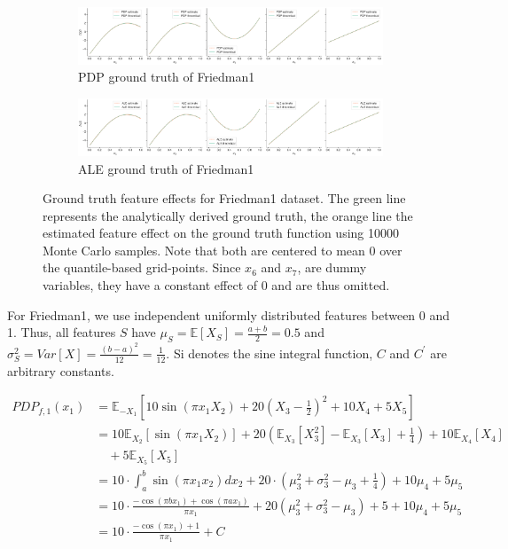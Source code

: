 \documentclass[runningheads]{llncs}
\begin{document}
\begin{figure}[h!]
    \begin{subfigure}[b]{\textwidth}
        \centering
        \includegraphics[width=\textwidth]{img/Friedman1-all/pdp_groundtruth_comparison.png}
        \caption{PDP ground truth of Friedman1}
    \end{subfigure}
    \begin{subfigure}[b]{\textwidth}
        \centering
        \includegraphics[width=\textwidth]{img/Friedman1-all/ale_groundtruth_comparison.png}
        \caption{ALE ground truth of Friedman1}
    \end{subfigure}
    \caption{Ground truth feature effects for Friedman1 dataset. The green line
    represents the analytically derived ground truth, the orange line the estimated feature
    effect on the ground truth function using 10000 Monte Carlo samples. Note that both
    are centered to mean 0 over the quantile-based grid-points.
    Since $x_6$ and $x_7$, are dummy variables, they have a constant effect of 0 and are
    thus omitted.}
    \label{fig:friedman1-groundtruth}  %
\end{figure}

For Friedman1, we use independent uniformly distributed features between 0
and 1. Thus, all features $S$ have $\mu_S = \mathbb{E}[X_S]=\frac{a+b}{2}=0.5$ and
$\sigma_S^2 = Var[X]=\frac{(b-a)^2}{12}=\frac{1}{12}$.
Si denotes the sine integral function, $C$ and $C^\prime$ are arbitrary constants.

\begin{align*}
    PDP_{f,1}(x_1) &= \mathbb{E}_{-X_1}[10\sin(\pi x_1X_2) + 20(X_3-\frac{1}{2})^2 + 10X_4 + 5X_5] \\
    &= 10 \mathbb{E}_{X_2}[\sin(\pi x_1X_2)] + 20(\mathbb{E}_{X_3}[X_3^2] - \mathbb{E}_{X_3}[X_3] + \frac{1}{4}) + 10 \mathbb{E}_{X_4}[X_4] \\
    &\quad + 5 \mathbb{E}_{X_5}[X_5]\\
    &= 10 \cdot \int_{a}^{b} \sin(\pi x_1x_2)dx_2 + 20\cdot(\mu_3^2 + \sigma_3^2 - \mu_3 + \frac{1}{4}) + 10\mu_4 + 5\mu_5 \\
    &= 10 \cdot \frac{-\cos(\pi bx_1) + \cos(\pi ax_1)}{\pi x_1} + 20(\mu_3^2 + \sigma_3^2 - \mu_3) + 5 + 10\mu_4 + 5\mu_5 \\
    &= 10 \cdot \frac{-\cos(\pi x_1) + 1}{\pi x_1} + C \\
\end{align*}
\end{document}
